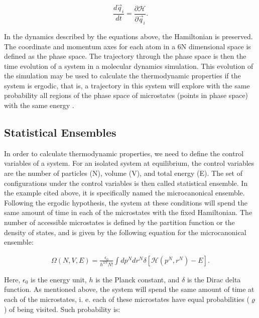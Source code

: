 \begin{equation}
\frac{d \vec{q}_{i}}{dt} =  \frac{\partial \mathcal{H}}{\partial \vec{q}_{i}}.
\end{equation}

In the dynamics described by the equations above, the Hamiltonian is preserved. The coordinate and momentum axes for each atom in a 6N dimensional space is defined as the phase space. The trajectory through the phase space is then the time evolution of a system in a molecular dynamics simulation. This evolution of the simulation may be used to calculate the thermodynamic properties if the system is ergodic, that is, a trajectory in this system will explore with the same probability all regions of the phase space of microstates (points in phase space) with the same energy \cite{shell2015}. 

\subsection{Statistical Ensembles}

In order to calculate thermodynamic properties, we need to define the control variables of a system. For an isolated system at equilibrium, the control variables are the number of particles (N), volume (V), and total energy (E). The set of configurations under the control variables is then called statistical ensemble. In the example cited above, it is specifically named the microcanonical ensemble. Following the ergodic hypothesis, the system at these conditions will spend the same amount of time in each of the microstates  with the fixed Hamiltonian.  The number of accessible microstates is defined by the partition function or the density of states, and  is given by the following equation  for the microcanonical ensemble: 

\begin{equation}
\begin{aligned}
\Omega (N,V,E) = \frac{\epsilon_{0}}{h^{3N}N!} \int dp^{N} dr^{N} \delta [\mathcal{H}(p^{N},r^{N}) -E].
\end{aligned}
\end{equation}

Here, $\epsilon _{0}$ is the energy unit, $h$ is the Planck constant, and $\delta$ is the Dirac delta function. As mentioned above, the system will spend the same amount of time at each of the microstates, i. e. each of these microstates have equal probabilities ($\varrho$) of being visited. Such probability is:

